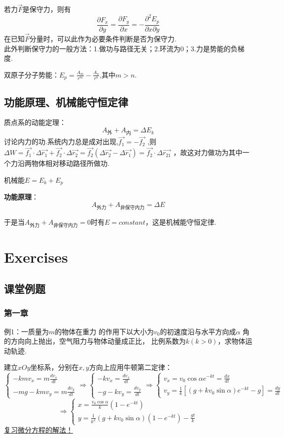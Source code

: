 \documentclass[10pt,a4paper]{article}
\begin{document}
若力$\vec{F}$是保守力，则有
\[\boxed{\frac{\partial F_x}{\partial y}=\frac{\partial F_y}{\partial x}}=
-\frac{\partial^2 E_p}{\partial x\partial y}
\]
在已知$\vec{F}$分量时，可以此作为必要条件判断是否为保守力.\\
此外判断保守力的一般方法：1.做功与路径无关；2.环流为0；3.力是势能的负梯度.

双原子分子势能：$E_p=\frac{A_m}{r^m}-\frac{A_n}{r^n}$,其中$m>n$.
\subsection{功能原理、机械能守恒定律}
质点系的动能定理：
\[A_\text{外}+A_\text{内}=\Delta E_k\]
讨论内力的功.系统内力总是成对出现,$\vec{f_1}=-\vec{f_2}$
,则$\Delta W=\vec{f_1}\cdot \Delta \vec{r_1}+\vec{f_2}\cdot \Delta \vec{r_2}
=\vec{f_2}(\Delta \vec{r_2}-\Delta \vec{r_1})=\vec{f_2}\cdot\Delta\vec{r_{21}}$
，故这对力做功为其中一个力沿两物体相对移动路径所做功.

机械能$E=E_k+E_p$

\textbf{功能原理}：
\[\boxed{A_\text{外力}+A_\text{非保守内力}=\Delta E}\]

于是当$A_\text{外力}+A_\text{非保守内力}=0$时有$E=constant$，这是机械能守恒定律.
\section{Exercises}
\subsection{课堂例题}
\subsubsection{第一章}
例1：一质量为$m$的物体在重力 的作用下以大小为$v_0$的初速度沿与水平方向成$\alpha$
角的方向向上抛出，空气阻力与物体动量成正比，
比例系数为$k(k>0)$，求物体运动轨迹.

建立$xOy$坐标系，分别在$x,y$方向上应用牛顿第二定律：
\[
\begin{cases}
-kmv_x=m\frac{dv_x}{dt}\\
-mg-kmv_y=m\frac{dv_y}{dt}
\end{cases}\Rightarrow
\begin{cases}
-kv_x=\frac{dv_x}{dt}\\
-g-kv_y=\frac{dv_y}{dt}
\end{cases}\Rightarrow
\begin{cases}
v_x=v_0\cos\alpha e^{-kt}=\frac{dx}{dt}\\
v_y=\frac{1}{k}[(g+kv_0\sin\alpha)e^{-kt}-g]=\frac{dy}{dt}
\end{cases}\]
\[
\Rightarrow
\begin{cases}
x=\frac{v_0\cos\alpha}{k}(1-e^{-kt})\\
y=\frac{1}{k^2}(g+kv_0\sin\alpha)(1-e^{-kt})-\frac{gt}{k}
\end{cases}
\]\underline{复习微分方程的解法！}
\end{document}
